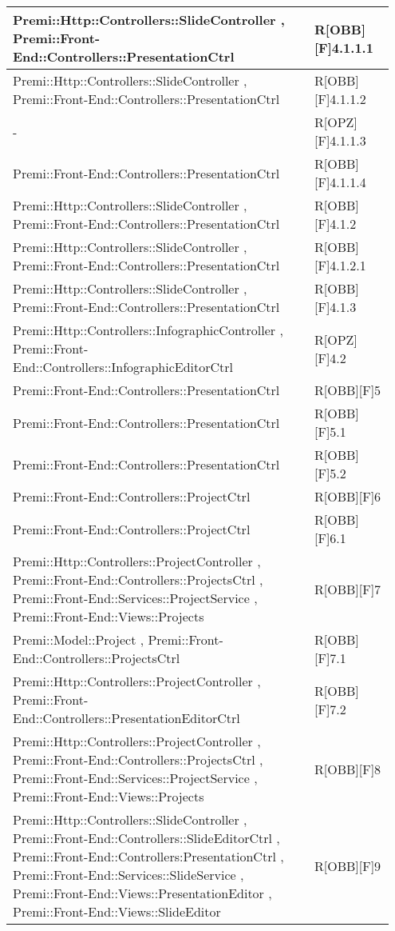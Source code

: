 \begin{table}[h]
	\begin{center}
		\begin{tabular}{|p{0.75\linewidth}|p{0.2\linewidth}|}
			\toprule
			Premi::Http::Controllers::SlideController , Premi::Front-End::Controllers::PresentationCtrl & R[OBB][F]4.1.1.1 \\
		\midrule
			Premi::Http::Controllers::SlideController , Premi::Front-End::Controllers::PresentationCtrl & R[OBB][F]4.1.1.2 \\
		\midrule
			- & R[OPZ][F]4.1.1.3 \\
		\midrule
			Premi::Front-End::Controllers::PresentationCtrl & R[OBB][F]4.1.1.4 \\
		\midrule
			Premi::Http::Controllers::SlideController , Premi::Front-End::Controllers::PresentationCtrl & R[OBB][F]4.1.2 \\
		\midrule
			Premi::Http::Controllers::SlideController , Premi::Front-End::Controllers::PresentationCtrl & R[OBB][F]4.1.2.1 \\
		\midrule
			Premi::Http::Controllers::SlideController , Premi::Front-End::Controllers::PresentationCtrl & R[OBB][F]4.1.3 \\
		\midrule
			Premi::Http::Controllers::InfographicController , Premi::Front-End::Controllers::InfographicEditorCtrl & R[OPZ][F]4.2 \\
		\midrule
			Premi::Front-End::Controllers::PresentationCtrl & R[OBB][F]5  \\
		\midrule
			Premi::Front-End::Controllers::PresentationCtrl & R[OBB][F]5.1 \\
		\midrule
			Premi::Front-End::Controllers::PresentationCtrl & R[OBB][F]5.2 \\
		\midrule
			Premi::Front-End::Controllers::ProjectCtrl & R[OBB][F]6 \\
		\midrule
			Premi::Front-End::Controllers::ProjectCtrl & R[OBB][F]6.1 \\
		\midrule
			Premi::Http::Controllers::ProjectController , Premi::Front-End::Controllers::ProjectsCtrl , Premi::Front-End::Services::ProjectService , Premi::Front-End::Views::Projects & R[OBB][F]7 \\
		\midrule
			Premi::Model::Project , Premi::Front-End::Controllers::ProjectsCtrl & R[OBB][F]7.1 \\
		\midrule
			Premi::Http::Controllers::ProjectController , Premi::Front-End::Controllers::PresentationEditorCtrl & R[OBB][F]7.2 \\
		\midrule
			Premi::Http::Controllers::ProjectController , Premi::Front-End::Controllers::ProjectsCtrl , Premi::Front-End::Services::ProjectService , Premi::Front-End::Views::Projects & R[OBB][F]8 \\
		\midrule
			Premi::Http::Controllers::SlideController , Premi::Front-End::Controllers::SlideEditorCtrl , Premi::Front-End::Controllers:PresentationCtrl , Premi::Front-End::Services::SlideService  , Premi::Front-End::Views::PresentationEditor , Premi::Front-End::Views::SlideEditor & R[OBB][F]9 \\
		\bottomrule
		\end{tabular}
	\end{center}
\end{table}
	

